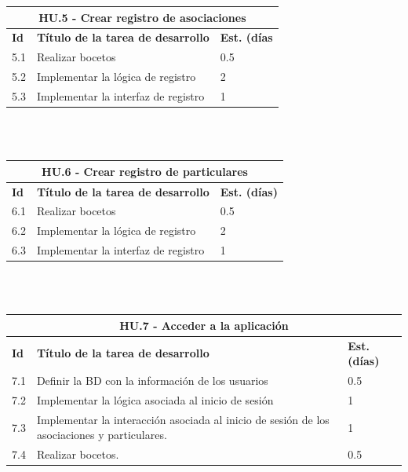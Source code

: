\begin{tabular}{|l|p{9.5cm}|p{1cm}|}
	\hline
	\multicolumn{3}{|c|}{\textbf{HU.5 - Crear registro de asociaciones}} \\
	\hline
	\textbf{Id} & \textbf{Título de la tarea de desarrollo} & \textbf{Est. (días} \\
	\hline
	5.1 & Realizar bocetos & 0.5 \\ \hline
	5.2 &  Implementar la lógica de registro & 2 \\ \hline
	5.3 &  Implementar la interfaz de registro & 1 \\ \hline
\end{tabular} \\ \\

\begin{tabular}{|l|p{9.5cm}|p{1cm}|}
	\hline
	\multicolumn{3}{|c|}{\textbf{HU.6 - Crear registro de particulares}} \\
	\hline
	\textbf{Id} & \textbf{Título de la tarea de desarrollo} & \textbf{Est. (días)} \\
	\hline
	6.1 & Realizar bocetos & 0.5 \\ \hline
	6.2 &  Implementar la lógica de registro & 2 \\ \hline
	6.3 &  Implementar la interfaz de registro & 1 \\ \hline
\end{tabular} \\ \\



\begin{tabular}{|l|p{9.5cm}|p{1cm}|}
	\hline
	\multicolumn{3}{|c|}{\textbf{HU.7 - Acceder a la aplicación}} \\
	\hline
	\textbf{Id} & \textbf{Título de la tarea de desarrollo} & \textbf{Est. (días)} \\
	\hline
	7.1 & Definir la BD con la información de los usuarios & 0.5 \\ \hline
	7.2 &  Implementar la lógica asociada al inicio de sesión & 1 \\ \hline
	7.3 &  Implementar la interacción asociada al inicio de sesión de los asociaciones y particulares. & 1 \\ \hline
	7.4 &  Realizar bocetos. & 0.5 \\ \hline
\end{tabular} \\ \\


